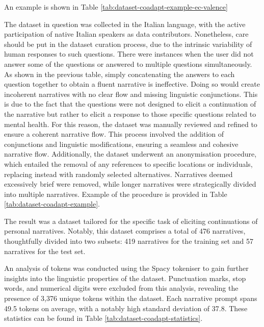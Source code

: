 
An example is shown in Table \ref{tab:dataset-coadapt-example-ec-valence}

The dataset in question was collected in the Italian language, with the active participation of native Italian speakers as data contributors. Nonetheless, care should be put in the dataset curation process, due to the intrinsic variability of human responses to such questions. There were instances when the user did not answer some of the questions or answered to multiple questions simultaneously. As shown in the previous table, simply concatenating the answers to each question together to obtain a fluent narrative is ineffective. Doing so would create incoherent narratives with no clear flow and missing linguistic conjunctions. This is due to the fact that the questions were not designed to elicit a continuation of the narrative but rather to elicit a response to those specific questions related to mental health.
For this reason, the dataset was manually reviewed and refined to ensure a coherent narrative flow. This process involved the addition of conjunctions and linguistic modifications, ensuring a seamless and cohesive narrative flow. Additionally, the dataset underwent an anonymisation procedure, which entailed the removal of any references to specific locations or individuals, replacing instead with randomly selected alternatives. Narratives deemed excessively brief were removed, while longer narratives were strategically divided into multiple narratives. Example of the procedure is provided in Table \ref{tab:dataset-coadapt-example}.
% 

The result was a dataset tailored for the specific task of eliciting continuations of personal narratives. Notably, this dataset comprises a total of 476 narratives, thoughtfully divided into two subsets: 419 narratives for the training set and 57 narratives for the test set.
% 

An analysis of tokens was conducted using the Spacy tokeniser to gain further insights into the linguistic properties of the dataset. Punctuation marks, stop words, and numerical digits were excluded from this analysis, revealing the presence of 3,376 unique tokens within the dataset. Each narrative prompt spans 49.5 tokens on average, with a notably high standard deviation of 37.8. These statistics can be found in Table \ref{tab:dataset-coadapt-statistics}. 

